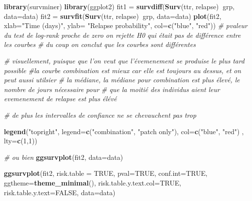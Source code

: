 \documentclass[
]{article}
\newenvironment{Shaded}{\begin{snugshade}}{\end{snugshade}}
\newcommand{\CommentTok}[1]{\textcolor[rgb]{0.56,0.35,0.01}{\textit{#1}}}
\newcommand{\DataTypeTok}[1]{\textcolor[rgb]{0.13,0.29,0.53}{#1}}
\newcommand{\DecValTok}[1]{\textcolor[rgb]{0.00,0.00,0.81}{#1}}
\newcommand{\KeywordTok}[1]{\textcolor[rgb]{0.13,0.29,0.53}{\textbf{#1}}}
\newcommand{\NormalTok}[1]{#1}
\newcommand{\OperatorTok}[1]{\textcolor[rgb]{0.81,0.36,0.00}{\textbf{#1}}}
\newcommand{\OtherTok}[1]{\textcolor[rgb]{0.56,0.35,0.01}{#1}}
\newcommand{\StringTok}[1]{\textcolor[rgb]{0.31,0.60,0.02}{#1}}
\begin{document}
\begin{Shaded}
\begin{Highlighting}[]
\KeywordTok{library}\NormalTok{(survminer)}
\KeywordTok{library}\NormalTok{(ggplot2)}
\NormalTok{fit1 =}\StringTok{ }\KeywordTok{survdiff}\NormalTok{(}\KeywordTok{Surv}\NormalTok{(ttr, relapse)}\OperatorTok{~}\NormalTok{grp, }\DataTypeTok{data=}\NormalTok{data)}
\NormalTok{fit2 =}\StringTok{ }\KeywordTok{survfit}\NormalTok{(}\KeywordTok{Surv}\NormalTok{(ttr, relapse)}\OperatorTok{~}\NormalTok{grp, }\DataTypeTok{data=}\NormalTok{data)}
\KeywordTok{plot}\NormalTok{(fit2, }\DataTypeTok{xlab=}\StringTok{"Time (days)"}\NormalTok{, }\DataTypeTok{ylab=} \StringTok{"Relapse probability"}\NormalTok{, }
     \DataTypeTok{col=}\KeywordTok{c}\NormalTok{(}\StringTok{"blue"}\NormalTok{, }\StringTok{"red"}\NormalTok{))}
\CommentTok{# pvaleur du test de log-rank proche de zero on rejette H0 qui était pas de différence entre les courbes}
\CommentTok{# du coup on conclut que les courbes sont différentes}

\CommentTok{# visuellement, puisque que l'on veut que l'évemenement se produise le plus tard possible}
\CommentTok{#la courbe combination est mieux car elle est toujours au dessus, et on peut aussi utilsier}
\CommentTok{# la médiane, la médiane pour combination est plus élevé, le nombre de jours nécessaire pour }
\CommentTok{# que la moitié des individus aient leur evemenement de relapse est plus élévé}

\CommentTok{# de plus les intervalles de confiance ne se chevauchent pas trop}

\KeywordTok{legend}\NormalTok{(}\StringTok{"topright"}\NormalTok{, }\DataTypeTok{legend=}\KeywordTok{c}\NormalTok{(}\StringTok{"combination"}\NormalTok{, }\StringTok{"patch only"}\NormalTok{), }\DataTypeTok{col=}\KeywordTok{c}\NormalTok{(}\StringTok{"blue"}\NormalTok{, }\StringTok{"red"}\NormalTok{) , }\DataTypeTok{lty=}\KeywordTok{c}\NormalTok{(}\DecValTok{1}\NormalTok{,}\DecValTok{1}\NormalTok{))}

\CommentTok{# ou bien}
\KeywordTok{ggsurvplot}\NormalTok{(fit2, }\DataTypeTok{data=}\NormalTok{data)}

\KeywordTok{ggsurvplot}\NormalTok{(fit2, }\DataTypeTok{risk.table =} \OtherTok{TRUE}\NormalTok{, }\DataTypeTok{pval=}\OtherTok{TRUE}\NormalTok{, }\DataTypeTok{conf.int=}\OtherTok{TRUE}\NormalTok{,}
           \DataTypeTok{ggtheme=}\KeywordTok{theme_minimal}\NormalTok{(),}
           \DataTypeTok{risk.table.y.text.col=}\OtherTok{TRUE}\NormalTok{,}
           \DataTypeTok{risk.table.y.text=}\OtherTok{FALSE}\NormalTok{, }\DataTypeTok{data=}\NormalTok{data)}
\end{Highlighting}
\end{Shaded}
\end{document}
